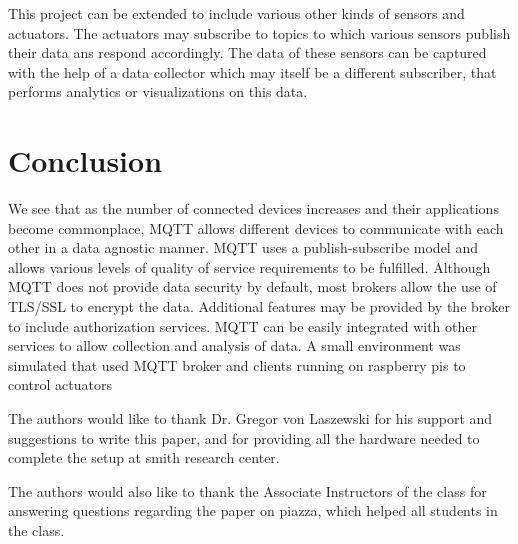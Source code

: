 \documentclass[sigconf]{acmart}
\begin{document}
This project can be extended to include various other kinds of sensors and actuators. The actuators may subscribe to topics to which various sensors publish their data ans respond accordingly. The data of these sensors can be captured with the help of a data collector which may itself be a different subscriber, that performs analytics or visualizations on this data.

\section{Conclusion}
We see that as the number of connected devices increases and their applications become commonplace, MQTT allows different devices to communicate with each other in a data agnostic manner. MQTT uses a publish-subscribe model and allows various levels of quality of service requirements to be fulfilled. Although MQTT does not provide data security by default, most brokers allow the use of TLS/SSL to encrypt the data. Additional features may be provided by the broker to include authorization services. MQTT can be easily integrated with other services to allow collection and analysis of data. A small environment was simulated that used MQTT broker and clients running on raspberry pis to control actuators

\begin{acks}
The authors would like to thank Dr. Gregor von Laszewski for his support and suggestions to write this paper, and for providing all the hardware needed to complete the setup at smith research center.

The authors would also like to thank the Associate Instructors of the class for answering questions regarding the paper on piazza, which helped all students in the class.
\end{acks}


 


\end{document}
